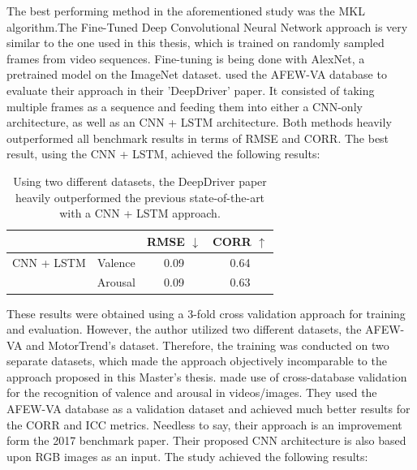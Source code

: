 The best performing method in the aforementioned study was the MKL algorithm.The Fine-Tuned Deep Convolutional Neural Network approach is very similar to the one used in this thesis, which is trained on randomly sampled frames from video sequences. Fine-tuning is being done with AlexNet, a pretrained model on the ImageNet dataset.
\newline\newline
\citet{Theagarajan:2018:DeepDriver} used the AFEW-VA database to evaluate their approach in their 'DeepDriver' paper. It consisted of taking multiple frames as a sequence and feeding them into either a CNN-only architecture, as well as an CNN + LSTM architecture. Both methods heavily outperformed all benchmark results in terms of RMSE and CORR. The best result, using the CNN + LSTM, achieved the following results:

\begin{table}[H]
\begin{center}
\begin{tabular}{@{}rccc@{}}
\toprule
\multicolumn{1}{c}{} &  & RMSE $\downarrow$ & CORR $\uparrow$ \\ \midrule
CNN + LSTM & Valence & 0.09 & 0.64 \\
 & \multicolumn{1}{l}{Arousal} & 0.09 & 0.63 \\ \bottomrule
\end{tabular}
\caption{Using two different datasets, the DeepDriver paper \citep{Theagarajan:2018:DeepDriver} heavily outperformed the previous state-of-the-art with a CNN + LSTM approach.}
\label{tab:BenchmarkDeepDriver}
\end{center}
\end{table}

These results were obtained using a 3-fold cross validation approach for training and evaluation. However, the author utilized two different datasets, the AFEW-VA and MotorTrend's dataset. Therefore, the training was conducted on two separate datasets, which made the approach objectively incomparable to the approach proposed in this Master's thesis. 
\newline\newline
\citet{Handrich:2020:SimultaneousPredVA} made use of cross-database validation for the recognition of valence and arousal in videos/images. They used the AFEW-VA database \citep{Kossaifi:2017:AFEW-VADatabase} as a validation dataset and achieved much better results for the CORR and ICC metrics. Needless to say, their approach is an improvement form the 2017 benchmark paper. Their proposed CNN architecture is also based upon RGB images as an input. The study achieved the following results:


